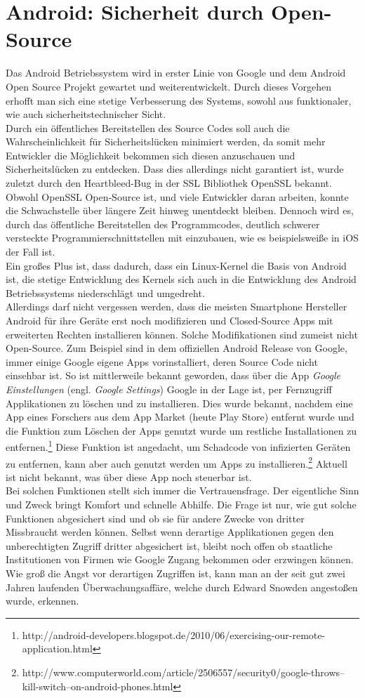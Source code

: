 \section{Android: Sicherheit durch Open-Source}
Das Android Betriebssystem wird in erster Linie von Google und dem Android Open Source Projekt gewartet und weiterentwickelt. Durch dieses Vorgehen erhofft man sich eine stetige Verbesserung des Systems, sowohl aus funktionaler, wie auch sicherheitstechnischer Sicht. \\
Durch ein öffentliches Bereitstellen des Source Codes soll auch die Wahrscheinlichkeit für Sicherheitslücken minimiert werden, da somit mehr Entwickler die Möglichkeit bekommen sich diesen anzuschauen und Sicherheitslücken zu entdecken. Dass dies allerdings nicht garantiert ist, wurde zuletzt durch den Heartbleed-Bug in der SSL Bibliothek OpenSSL bekannt. Obwohl OpenSSL Open-Source ist, und viele Entwickler daran arbeiten, konnte die Schwachstelle über längere Zeit hinweg unentdeckt bleiben. Dennoch wird es, durch das öffentliche Bereitstellen des Programmcodes, deutlich schwerer versteckte Programmierschnittstellen mit einzubauen, wie es beispielsweiße in iOS der Fall ist.\\
Ein großes Plus ist, dass dadurch, dass ein Linux-Kernel die Basis von Android ist, die stetige Entwicklung des Kernels sich auch in die Entwicklung des Android Betriebssystems niederschlägt und umgedreht.\\
Allerdings darf nicht vergessen werden, dass die meisten Smartphone Hersteller Android für ihre Geräte erst noch modifizieren und Closed-Source Apps mit erweiterten Rechten installieren können. Solche Modifikationen sind zumeist nicht Open-Source. Zum Beispiel sind in dem offiziellen Android Release von Google, immer einige Google eigene Apps vorinstalliert, deren Source Code nicht einsehbar ist. So ist mittlerweile bekannt geworden, dass über die App \textit{Google Einstellungen} (engl. \textit{Google Settings}) Google in der Lage ist, per Fernzugriff Applikationen zu löschen und zu installieren. Dies wurde bekannt, nachdem eine App eines Forschers aus dem App Market (heute Play Store) entfernt wurde und die Funktion zum Löschen der Apps genutzt wurde um restliche Installationen zu entfernen.\footnote{http://android-developers.blogspot.de/2010/06/exercising-our-remote-application.html} 
Diese Funktion ist angedacht, um Schadcode von infizierten Geräten zu entfernen, kann aber auch genutzt werden um Apps zu installieren.\footnote{http://www.computerworld.com/article/2506557/security0/google-throws--kill-switch--on-android-phones.html} Aktuell ist nicht bekannt, was über diese App noch steuerbar ist.\\
Bei solchen Funktionen stellt sich immer die Vertrauensfrage. Der eigentliche Sinn und Zweck bringt Komfort und schnelle Abhilfe. Die Frage ist nur, wie gut solche Funktionen abgesichert sind und ob sie für andere Zwecke von dritter Missbraucht werden können. Selbst wenn derartige Applikationen gegen den unberechtigten Zugriff dritter abgesichert ist, bleibt noch offen ob staatliche Institutionen von Firmen wie Google Zugang bekommen oder erzwingen können. Wie groß die Angst vor derartigen Zugriffen ist, kann man an der seit gut zwei Jahren laufenden Überwachungsaffäre, welche durch Edward Snowden angestoßen wurde, erkennen.